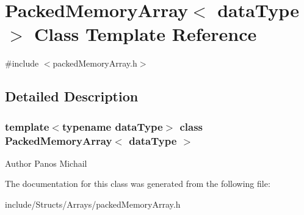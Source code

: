 \hypertarget{class_packed_memory_array}{
\section{PackedMemoryArray$<$ dataType $>$ Class Template Reference}
\label{class_packed_memory_array}
}


{\ttfamily \#include $<$packedMemoryArray.h$>$}



\subsection{Detailed Description}
\subsubsection*{template$<$typename dataType$>$ class PackedMemoryArray$<$ dataType $>$}

\begin{DoxyAuthor}{Author}
Panos Michail 
\end{DoxyAuthor}


The documentation for this class was generated from the following file:\begin{DoxyCompactItemize}
\item 
include/Structs/Arrays/packedMemoryArray.h\end{DoxyCompactItemize}
